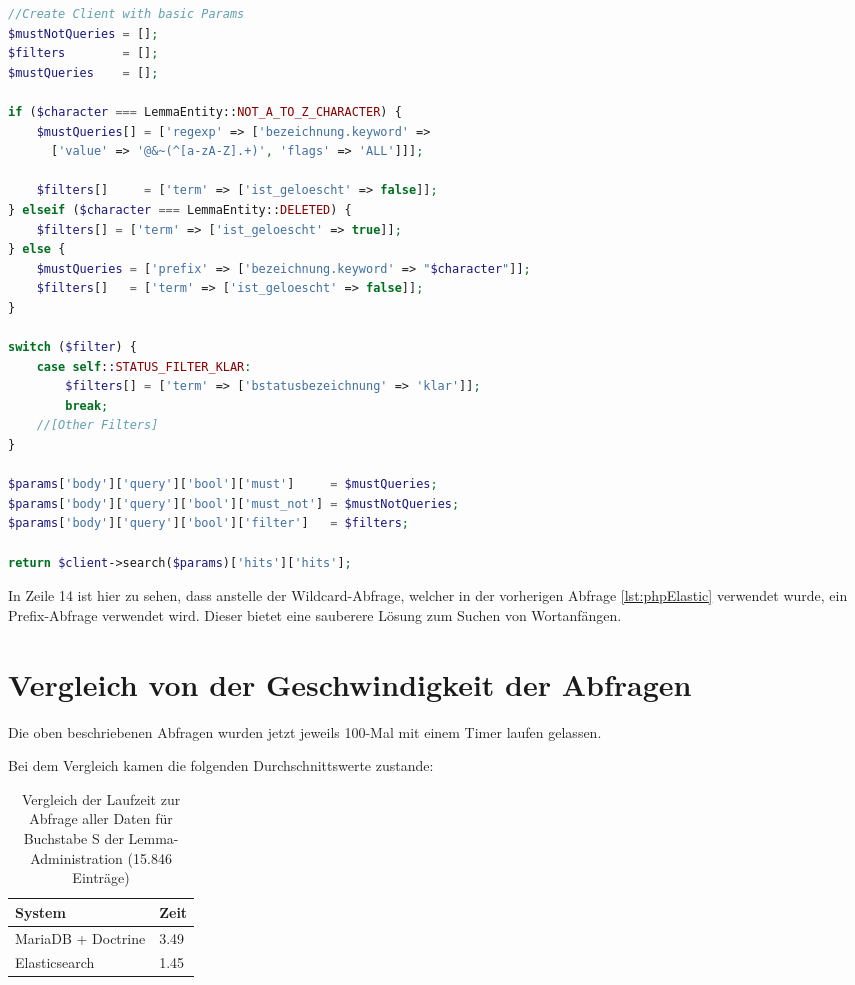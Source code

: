 \begin{lstlisting}[language=PHP, frame=single, label={lst:queryEla}] 
//Create Client with basic Params
$mustNotQueries = [];
$filters        = [];
$mustQueries    = [];

if ($character === LemmaEntity::NOT_A_TO_Z_CHARACTER) {
    $mustQueries[] = ['regexp' => ['bezeichnung.keyword' => 
      ['value' => '@&~(^[a-zA-Z].+)', 'flags' => 'ALL']]];
      
    $filters[]     = ['term' => ['ist_geloescht' => false]];
} elseif ($character === LemmaEntity::DELETED) {
    $filters[] = ['term' => ['ist_geloescht' => true]];
} else {
    $mustQueries = ['prefix' => ['bezeichnung.keyword' => "$character"]];
    $filters[]   = ['term' => ['ist_geloescht' => false]];
}

switch ($filter) {
    case self::STATUS_FILTER_KLAR:
        $filters[] = ['term' => ['bstatusbezeichnung' => 'klar']];
        break;
    //[Other Filters]
}

$params['body']['query']['bool']['must']     = $mustQueries;
$params['body']['query']['bool']['must_not'] = $mustNotQueries;
$params['body']['query']['bool']['filter']   = $filters;

return $client->search($params)['hits']['hits'];
\end{lstlisting}

In Zeile 14 ist hier zu sehen, dass anstelle der Wildcard-Abfrage, welcher in der vorherigen Abfrage \ref{lst:phpElastic} verwendet wurde, ein Prefix-Abfrage verwendet wird. Dieser bietet eine sauberere Lösung zum Suchen von Wortanfängen.

\section{Vergleich von der Geschwindigkeit der Abfragen}

Die oben beschriebenen Abfragen wurden jetzt jeweils 100-Mal mit einem Timer laufen gelassen. 

Bei dem Vergleich kamen die folgenden Durchschnittswerte zustande:
\begin{table} %
	\centering
		\begin{tabular}{l | l }
		    \textbf{System} & \textbf{Zeit} \\
        \hline
        MariaDB + Doctrine & 3.49 \\
        Elasticsearch      & 1.45  \\
		\end{tabular}
    \caption{Vergleich der Laufzeit zur Abfrage aller Daten für Buchstabe S der Lemma-Administration (15.846 Einträge)}
    \label{vlgTimeDBvsEla}
\end{table}

